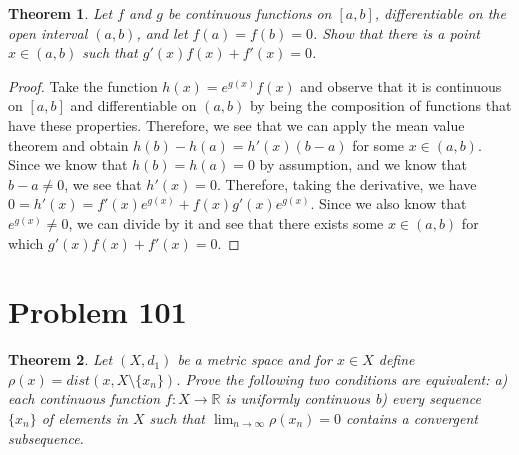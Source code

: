 \documentclass[psamsfonts]{amsart}
\newtheorem{thm}{Theorem}[section]
\theoremstyle{definition}
\theoremstyle{remark}
\numberwithin{equation}{section}
\begin{document}
\begin{thm}
Let $f$ and $g$ be continuous functions on $[a,b]$, differentiable on the open interval $(a,b)$, and let $f(a) = f(b) = 0$. Show that there is a point $x \in (a,b)$ such that $g'(x) f(x) + f'(x) = 0$. 
\end{thm}

\begin{proof}
Take the function $h(x) = e^{g(x)} f(x)$ and observe that it is continuous on $[a,b]$ and differentiable on $(a,b)$ by being the composition of functions that have these properties. Therefore, we see that we can apply the mean value theorem and obtain $h(b) - h(a) = h'(x) (b-a)$ for some $x \in (a,b)$. Since we know that $h(b) = h(a) = 0$ by assumption, and we know that $b-a \neq 0$, we see that $h'(x) = 0$. Therefore, taking the derivative, we have $0 = h'(x) = f'(x) e^{g(x)} + f(x) g'(x) e^{g(x)}$. Since we also know that $e^{g(x)} \neq 0$, we can divide by it and see that there exists some $x \in (a,b)$ for which $g'(x) f(x) + f'(x) = 0$. 
\end{proof}

\section{Problem 101}

\begin{thm}
Let $(X,d_1)$ be a metric space and for $x \in X$ define $\rho(x) = dist(x, X \setminus \{x_n\})$. Prove the following two conditions are equivalent: a) each continuous function $f: X \to \mathbb{R}$ is uniformly continuous b) every sequence $\{ x_n \}$ of elements in $X$ such that $\lim_{n \to \infty} \rho(x_n) = 0$ contains a convergent subsequence.
\end{thm}
\end{document}
